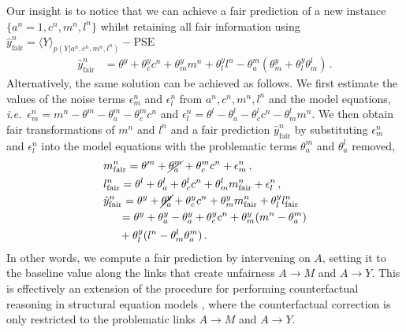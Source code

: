 \documentclass{article}
\newcommand{\av}[1]{\langle #1 \rangle}
\newcommand{\ie}{\emph{i.e.}}
\begin{document}
Our insight is to notice that we can achieve a fair prediction of a new instance $\{a^n=1,c^n,m^n,l^n\}$ whilst retaining all fair information using $\hat y^n_{\textrm{fair}} =\av{Y}_{p(Y|a^n,c^n,m^n,l^n)} - \textrm{PSE}$
\begin{align*}
\hat y^n_{\textrm{fair}} &=\theta^y+\theta^y_{c}c^n+\theta^y_{m}m^n+\theta^y_{l}l^n -\theta^m_{a}(\theta^y_{m}+\theta^y_{l}\theta^l_{m})\,.
\end{align*}
Alternatively, the same solution can be achieved as follows. We first estimate the values of the noise terms $\epsilon^n_m$ and $\epsilon^n_l$ from $a^n, c^n, m^n, l^n$ and the model equations, \ie~$\epsilon^n_m = m^n - \theta^m - \theta^m_{a} - \theta^m_{c}c^n$ and 
$\epsilon^n_l = \theta^l - \theta^l_{a} - \theta^l_{c}c^n - \theta^l_{m}m^n$. We then obtain fair transformations of $m^n$ and $l^n$ and a fair prediction $\hat y^n_{\textrm{fair}}$
by substituting $\epsilon^n_m$ and $\epsilon^n_l$ into the model equations with the problematic terms $\theta^m_{a}$ and $\theta^l_{a}$ removed,
\begin{align}
&m^n_{\textrm{fair}} = \theta^m + \cancel{\theta^m_{a}} + \theta^m_{c}c^n  + \epsilon^n_m\,,\nonumber\\
&l^n_{\textrm{fair}}  = \theta^l + \theta^l_{a} + \theta^l_{c}c^n + \theta^l_{m}m^n_{\textrm{fair}} +\epsilon^n_l\,,\nonumber\\
&\hat y^n_{\textrm{fair}}  =\theta^y+ \cancel{\theta^y_{a}} +\theta^y_{c}c^n+\theta^y_{m}m^n_{\textrm{fair}}+\theta^y_{l}l^n_{\textrm{fair}}\nonumber\\
&\hskip0.5cm=\theta^y+\theta^y_{a} -\theta^y_{a} + \theta^y_{c}c^n+ \theta^y_{m}(m^n-\theta^m_{a})\nonumber\\
&\hskip0.5cm+\theta^y_{l}(l^n - \theta^l_{m}\theta^m_{a})\,.
\label{eq:CR}
\end{align}
In other words, we compute a fair prediction by intervening on $A$, setting it to the baseline value along the links that create unfairness $A\rightarrow M$ and $A\rightarrow Y$.
This is effectively an extension of the procedure for performing counterfactual reasoning in structural equation models \cite{pearl00causality}, where the counterfactual correction is only restricted to the problematic links $A\rightarrow M$ and $A\rightarrow Y$.
\end{document}
